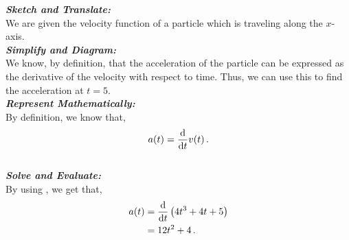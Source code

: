 %
%
%


\begin{subquestions}
	
\subquestion

\begin{subsubquestions}
	
\subsubquestion

\textbf{\textit{Sketch and Translate:}} \\ 
We are given the velocity function of a particle which is traveling along the $x$-axis. \\




\textbf{\textit{Simplify and Diagram:}} \\ 
We know, by definition, that the acceleration of the particle can be expressed as the derivative of the velocity with respect to time. Thus, we can use this to find the acceleration at $t=5$.\\




\textbf{\textit{Represent Mathematically:}} \\ 
By definition, we know that,
\begin{equation}
	a(t) = \frac{\mathrm{d}}{\mathrm{d}t} v(t) \label{2005:q5:AEqn1} \,.
\end{equation}\\




\textbf{\textit{Solve and Evaluate:}} \\ 
By using , we get that,
\begin{align}
	a(t) & = \frac{\mathrm{d}}{\mathrm{d}t} \left(4t^3 +4t +5\right) \nonumber \\
	     & = 12t^2 + 4 \,.
\end{align}


\end{subsubquestions}
\end{subquestions}
